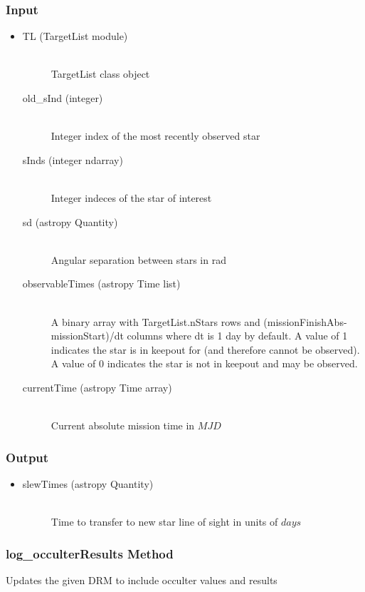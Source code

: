 \documentclass[cleanfoot]{asme2ej}
\begin{document}
\subsubsection*{Input}
\begin{itemize}
\item
\begin{description}
    \item[TL (TargetList module)] \hfill \\ TargetList class object
    \item[old\_sInd (integer)] \hfill \\ Integer index of the most recently observed star
    \item[sInds (integer ndarray)] \hfill \\ Integer indeces of the star of interest
    \item[sd (astropy Quantity)] \hfill \\ Angular separation between stars in rad
    \item[observableTimes (astropy Time list)] \hfill \\ A binary array with TargetList.nStars rows and (missionFinishAbs-missionStart)/dt columns where dt is 1 day by default. A value of 1 indicates the star is in keepout for (and therefore cannot be observed). A value of 0 indicates the star is not in keepout and may be observed.
    \item[currentTime (astropy Time array)] \hfill \\ Current absolute mission time in $MJD$
\end{description}
\end{itemize}
\subsubsection*{Output}
\begin{itemize}
\item
\begin{description}
    \item[slewTimes (astropy Quantity)] \hfill \\ Time to transfer to new star line of sight in units of $days$
\end{description}
\end{itemize}

\subsubsection{log\_occulterResults Method} \label{}
Updates the given DRM to include occulter values and results
\end{document}

